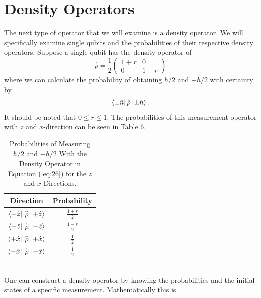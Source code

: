 \documentclass[twocolumn]{article}
\begin{document}
\section*{Density Operators}
The next type of operator that we will examine is a density operator. We will specifically examine single qubits and the probabilities of their respective density operators. Suppose a single qubit has the density operator of
\begin{equation} \label{eq:26}
\hat{\rho}=\frac{1}{2}
\begin{pmatrix}
1+r & 0 \\
0 & 1-r
\end{pmatrix}
\end{equation}
where we can calculate the probability of obtaining $\hbar/2$ and $-\hbar/2$ with certainty by
\begin{equation} \label{eq:27}
\bra{\pm \hat{n}} \hat{\rho} \ket{\pm \hat{n}}.
\end{equation}
It should be noted that $0 \leq r \leq 1$. The probabilities of this measurement operator with $z$ and $x$-direction can be seen in Table 6.
\begin{table}[h!]
\begin{center}
\begin{tabular}{ |c|c| }
\hline Direction & Probability \\
\hline $\bra{+\hat{z}}$ $\hat{\rho}$ $\ket{+\hat{z}}$ & $\frac{1+r}{2}$ \\
\hline $\bra{-\hat{z}}$ $\hat{\rho}$ $\ket{-\hat{z}}$ & $\frac{1-r}{2}$ \\
\hline $\bra{+\hat{x}}$ $\hat{\rho}$ $\ket{+\hat{x}}$ & $\frac{1}{2}$ \\
\hline $\bra{-\hat{x}}$ $\hat{\rho}$ $\ket{-\hat{x}}$ & $\frac{1}{2}$ \\
\hline
\end{tabular}
\caption{Probabilities of Measuring $\hbar/2$ and $-\hbar/2$ With the Density Operator in Equation (\ref{eq:26}) for the $z$ and $x$-Directions.}
\end{center}
\end{table} \\
One can construct a density operator by knowing the probabilities and the initial states of a specific measurement. Mathematically this is
\end{document}
